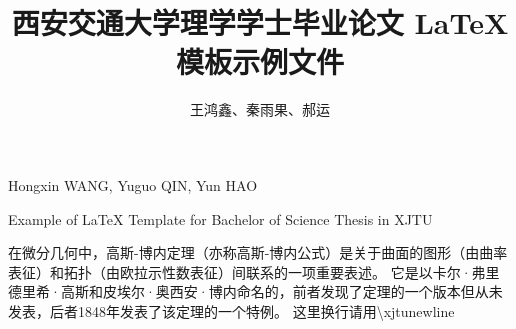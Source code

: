 \documentclass[%
               amsthm,
              ]{xjtubsc}
\begin{document}

\author{王鸿鑫、秦雨果、郝运}{Hongxin WANG, Yuguo QIN, Yun HAO}	%
\title{西安交通大学理学学士毕业论文 \LaTeX{} 模板示例文件}{Example of \LaTeX{} Template for Bachelor of Science Thesis in XJTU}	%

{}	%

\begin{INFObackground} %
在微分几何中，高斯-博内定理（亦称高斯-博内公式）是关于曲面的图形（由曲率表征）和拓扑（由欧拉示性数表征）间联系的一项重要表述。\xjtunewline
它是以卡尔·弗里德里希·高斯和皮埃尔·奥西安·博内命名的，前者发现了定理的一个版本但从未发表，后者1848年发表了该定理的一个特例。\xjtunewline
这里换行请用\textbackslash xjtunewline
\end{INFObackground}

\begin{INFOdata} %
\end{INFOdata}

\begin{INFOtask} %
\end{INFOtask}

\begin{INFOrequirement} %
\end{INFOrequirement}

\begin{INFOsubmit} %
\end{INFOsubmit}

\begin{INFOreference} %
\end{INFOreference}

\frontmatter

\extrapages %
\end{document}
